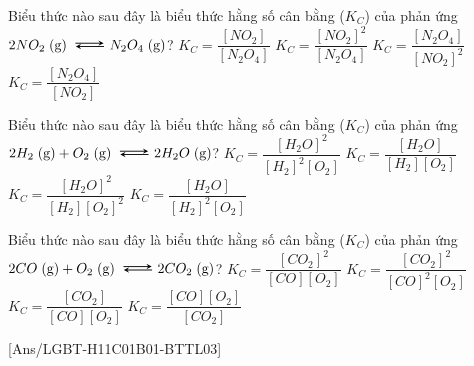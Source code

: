 \begin{ex}
	Biểu thức nào sau đây là biểu thức hằng số cân bằng ($K_C$) của phản ứng $2NO_2\;(\mathrm{g}) \xleftrightarrow N_2O_4\;(\mathrm{g})$?
	\choice
	{$K_C = \dfrac{\left[NO_2\right]}{\left[N_2O_4\right]}$}
	{$K_C = \dfrac{\left[NO_2\right]^2}{\left[N_2O_4\right]}$}
	{\True $K_C = \dfrac{\left[N_2O_4\right]}{\left[NO_2\right]^2}$}
	{$K_C = \dfrac{\left[N_2O_4\right]}{\left[NO_2\right]}$}
\end{ex}
\begin{ex}
	Biểu thức nào sau đây là biểu thức hằng số cân bằng ($K_C$) của phản ứng $2H_2\;(\mathrm{g}) + O_2\;(\mathrm{g}) \xleftrightarrow 2H_2O\;(\mathrm{g})$?
	\choice
	{\True $K_C = \dfrac{\left[H_2O\right]^2}{\left[H_2\right]^2\left[O_2\right]}$}
	{$K_C = \dfrac{\left[H_2O\right]}{\left[H_2\right]\left[O_2\right]}$}
	{$K_C = \dfrac{\left[H_2O\right]^2}{\left[H_2\right]\left[O_2\right]^2}$}
	{$K_C = \dfrac{\left[H_2O\right]}{\left[H_2\right]^2\left[O_2\right]}$}
\end{ex}
\begin{ex}
	Biểu thức nào sau đây là biểu thức hằng số cân bằng ($K_C$) của phản ứng $2CO\;(\mathrm{g}) + O_2\;(\mathrm{g}) \xleftrightarrow 2CO_2\;(\mathrm{g})$?
	\choice
	{$K_C = \dfrac{\left[CO_2\right]^2}{\left[CO\right]\left[O_2\right]}$}
	{\True $K_C = \dfrac{\left[CO_2\right]^2}{\left[CO\right]^2\left[O_2\right]}$}
	{$K_C = \dfrac{\left[CO_2\right]}{\left[CO\right]\left[O_2\right]}$}
	{$K_C = \dfrac{\left[CO\right]\left[O_2\right]}{\left[CO_2\right]}$}
\end{ex}
[Ans/LGBT-H11C01B01-BTTL03]
